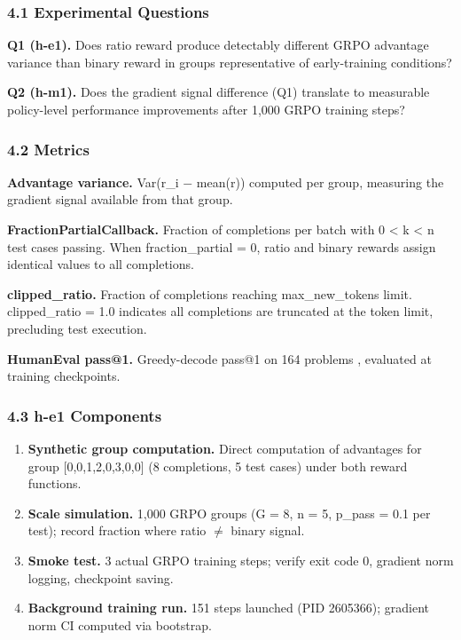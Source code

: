 
\subsubsection{4.1 Experimental Questions}

\textbf{Q1 (h-e1).} Does ratio reward produce detectably different GRPO advantage variance than binary reward in groups representative of early-training conditions?

\textbf{Q2 (h-m1).} Does the gradient signal difference (Q1) translate to measurable policy-level performance improvements after 1,000 GRPO training steps?

\subsubsection{4.2 Metrics}

\textbf{Advantage variance.} Var({r\_i $-$ mean(r)}) computed per group, measuring the gradient signal available from that group.

\textbf{FractionPartialCallback.} Fraction of completions per batch with 0 < k < n test cases passing. When fraction\_partial = 0, ratio and binary rewards assign identical values to all completions.

\textbf{clipped\_ratio.} Fraction of completions reaching max\_new\_tokens limit. clipped\_ratio = 1.0 indicates all completions are truncated at the token limit, precluding test execution.

\textbf{HumanEval pass@1.} Greedy-decode pass@1 on 164 problems \citep{Chen2021HumanEval}, evaluated at training checkpoints.

\subsubsection{4.3 h-e1 Components}

\begin{enumerate}
\item \textbf{Synthetic group computation.} Direct computation of advantages for group [0,0,1,2,0,3,0,0] (8 completions, 5 test cases) under both reward functions.
\item \textbf{Scale simulation.} 1,000 GRPO groups (G = 8, n = 5, p\_pass = 0.1 per test); record fraction where ratio $\neq$ binary signal.
\item \textbf{Smoke test.} 3 actual GRPO training steps; verify exit code 0, gradient norm logging, checkpoint saving.
\item \textbf{Background training run.} 151 steps launched (PID 2605366); gradient norm CI computed via bootstrap.
\end{enumerate}

